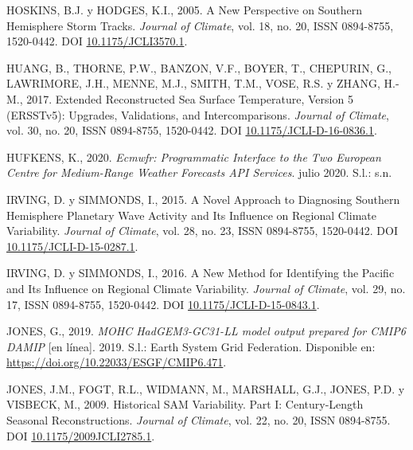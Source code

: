 \documentclass[12pt,oneside,a4paper]{reedthesis}
\newlength{\cslhangindent}
\newenvironment{CSLReferences}[2] %
 {%
  \setlength{\parindent}{0pt}
  \ifodd #1 \everypar{\setlength{\hangindent}{\cslhangindent}}\ignorespaces\fi
  \ifnum #2 > 0
  \setlength{\parskip}{#2\baselineskip}
  \fi
 }%
 {}
\begin{document}
\begin{CSLReferences}{1}{0}
\leavevmode{}%
HOSKINS, B.J. y HODGES, K.I., 2005. A {New Perspective} on {Southern Hemisphere Storm Tracks}. \emph{Journal of Climate}, vol. 18, no. 20, ISSN 0894-8755, 1520-0442. DOI \href{https://doi.org/10.1175/JCLI3570.1}{10.1175/JCLI3570.1}.

\leavevmode{}%
HUANG, B., THORNE, P.W., BANZON, V.F., BOYER, T., CHEPURIN, G., LAWRIMORE, J.H., MENNE, M.J., SMITH, T.M., VOSE, R.S. y ZHANG, H.-M., 2017. Extended {Reconstructed Sea Surface Temperature}, {Version} 5 ({ERSSTv5}): {Upgrades}, {Validations}, and {Intercomparisons}. \emph{Journal of Climate}, vol. 30, no. 20, ISSN 0894-8755, 1520-0442. DOI \href{https://doi.org/10.1175/JCLI-D-16-0836.1}{10.1175/JCLI-D-16-0836.1}.

\leavevmode{}%
HUFKENS, K., 2020. \emph{Ecmwfr: {Programmatic} Interface to the Two {European Centre} for {Medium-Range Weather Forecasts API} Services}. julio 2020. S.l.: s.n.

\leavevmode{}%
IRVING, D. y SIMMONDS, I., 2015. A {Novel Approach} to {Diagnosing Southern Hemisphere Planetary Wave Activity} and {Its Influence} on {Regional Climate Variability}. \emph{Journal of Climate}, vol. 28, no. 23, ISSN 0894-8755, 1520-0442. DOI \href{https://doi.org/10.1175/JCLI-D-15-0287.1}{10.1175/JCLI-D-15-0287.1}.

\leavevmode{}%
IRVING, D. y SIMMONDS, I., 2016. A {New Method} for {Identifying} the {Pacific} and {Its Influence} on {Regional Climate Variability}. \emph{Journal of Climate}, vol. 29, no. 17, ISSN 0894-8755, 1520-0442. DOI \href{https://doi.org/10.1175/JCLI-D-15-0843.1}{10.1175/JCLI-D-15-0843.1}.

\leavevmode{}%
JONES, G., 2019. \emph{MOHC HadGEM3-GC31-LL model output prepared for CMIP6 DAMIP} {[}en línea{]}. 2019. S.l.: Earth System Grid Federation. Disponible en: \url{https://doi.org/10.22033/ESGF/CMIP6.471}.

\leavevmode{}%
JONES, J.M., FOGT, R.L., WIDMANN, M., MARSHALL, G.J., JONES, P.D. y VISBECK, M., 2009. Historical {SAM Variability}. {Part I}: {Century-Length Seasonal Reconstructions}. \emph{Journal of Climate}, vol. 22, no. 20, ISSN 0894-8755. DOI \href{https://doi.org/10.1175/2009JCLI2785.1}{10.1175/2009JCLI2785.1}.


\end{CSLReferences}
\end{document}
